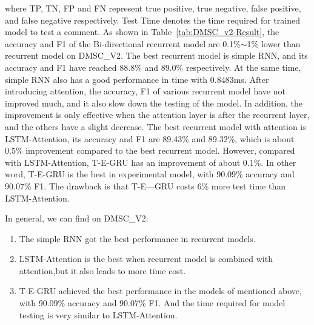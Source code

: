 where TP, TN, FP and FN represent true positive, true negative, false positive, and false negative respectively. Test Time denotes the time required for trained model to test a comment.
As shown in Table~\ref{tab:DMSC_v2-Result}, the accuracy and F1 of the Bi-directional recurrent model are 0.1\%$\sim$1\% lower than recurrent model on DMSC\_V2. The best recurrent model is simple RNN, and its accuracy and F1 have reached 88.8\% and 89.0\% respectively. At the same time, simple RNN also has a good performance in time with 0.8483ms.
After introducing attention, the accuracy, F1 of various recurrent model have not improved much, and it also slow down the testing of the model. In addition, the improvement is only effective when the attention layer is after the recurrent layer, and the others have a slight decrease. The best recurrent model with attention is LSTM-Attention, its accuracy and F1 are 89.43\% and 89.32\%, which is about 0.5\% improvement compared to the best recurrent model. 
However, compared with LSTM-Attention, T-E-GRU has an improvement of about 0.1\%. In other word, T-E-GRU is the best in experimental model, with 90.09\% accuracy and 90.07\% F1. The drawback is that T-E—GRU costs 6\% more test time than LSTM-Attention.

In general, we can find on DMSC\_V2:
\begin{enumerate}
    \item The simple RNN got the best performance in recurrent models.
    \item LSTM-Attention is the best when recurrent model is combined with attention,but it also leads to more time cost.
    \item T-E-GRU achieved the best performance in the models of mentioned above, with 90.09\% accuracy and 90.07\% F1. And the time required for model testing is very similar to LSTM-Attention.
\end{enumerate}



